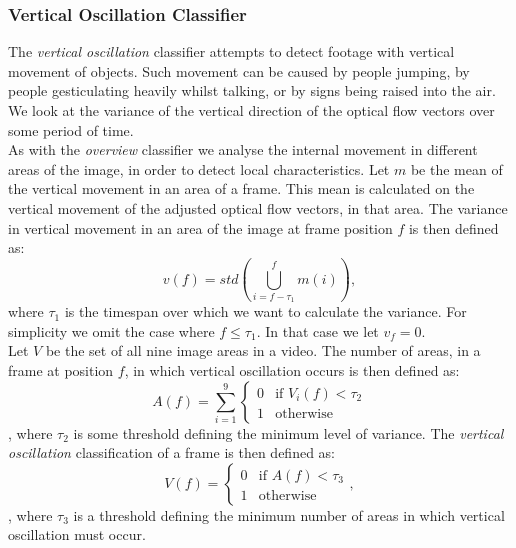 \subsubsection{Vertical Oscillation Classifier}\label{sec:verticaloscillationclassifier}
%
The \textit{vertical oscillation} classifier attempts to detect footage with vertical movement of objects. Such movement can be caused by people jumping, by people gesticulating heavily whilst talking, or by signs being raised into the air. We look at the variance of the vertical direction of the optical flow vectors over some period of time.\\
As with the \textit{overview} classifier we analyse the internal movement in different areas of the image, in order to detect local characteristics. Let $m$ be the mean of the vertical movement in an area of a frame. This mean is calculated on the vertical movement of the adjusted optical flow vectors, in that area. The variance in vertical movement in an area of the image at frame position $f$ is then defined as:
%
\begin{equation}
v(f) = std \left (\bigcup_{i=f-\tau_1}^{f} m(i) \right ),
\end{equation}
%
where $\tau_1$ is the timespan over which we want to calculate the variance. For simplicity we omit the case where $f \leq \tau_1$. In that case we let $v_{f} = 0$.\\
Let $V$ be the set of all nine image areas in a video. The number of areas, in a frame at position $f$, in which vertical oscillation occurs is then defined as:
%
\begin{equation}
A(f) = \sum_{i=1}^{9}
\begin{cases}
0 & \text{if } V_{i}(f) < \tau_2\\
1 &  \text{otherwise}
\end{cases}
\end{equation},
%
where $\tau_2$ is some threshold defining the minimum level of variance. The \textit{vertical oscillation} classification of a frame is then defined as:
%
\begin{equation}
V(f) =
\begin{cases}
0 & \text{if } A(f) < \tau_3\\
1 &  \text{otherwise}
\end{cases},
\end{equation},
%
where $\tau_3$ is a threshold defining the minimum number of areas in which vertical oscillation must occur.
%
